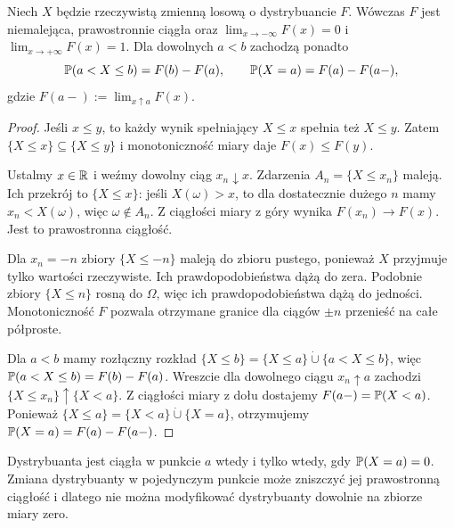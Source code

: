 \begin{twierdzenie}
Niech $X$ będzie rzeczywistą zmienną losową o dystrybuancie $F$.
Wówczas $F$ jest niemalejąca, prawostronnie ciągła oraz
$\lim_{x\to-\infty}F(x)=0$ i $\lim_{x\to+\infty}F(x)=1$.
Dla dowolnych $a<b$ zachodzą ponadto
\[
\mathbb{P}(a<X\leq b)=F(b)-F(a),\qquad
\mathbb{P}(X=a)=F(a)-F(a-),
\]
gdzie $F(a-):=\lim_{x\uparrow a}F(x)$.
\end{twierdzenie}
\begin{proof}
Jeśli $x\leq y$, to każdy wynik spełniający $X\leq x$
spełnia też $X\leq y$. Zatem
$\{X\leq x\}\subseteq\{X\leq y\}$ i monotoniczność
miary daje $F(x)\leq F(y)$.

Ustalmy $x\in\mathbb{R}$ i weźmy dowolny ciąg $x_n\downarrow x$.
Zdarzenia $A_n=\{X\leq x_n\}$ maleją. Ich przekrój
to $\{X\leq x\}$: jeśli $X(\omega)>x$, to dla
dostatecznie dużego $n$ mamy $x_n<X(\omega)$,
więc $\omega\notin A_n$. Z ciągłości miary z góry
wynika $F(x_n)\to F(x)$. Jest to prawostronna ciągłość.

Dla $x_n=-n$ zbiory $\{X\leq-n\}$ maleją
do zbioru pustego, ponieważ $X$ przyjmuje tylko
wartości rzeczywiste. Ich prawdopodobieństwa dążą do zera.
Podobnie zbiory $\{X\leq n\}$ rosną do $\Omega$,
więc ich prawdopodobieństwa dążą do jedności.
Monotoniczność $F$ pozwala otrzymane granice dla
ciągów $\pm n$ przenieść na całe półproste.

Dla $a<b$ mamy rozłączny rozkład
$\{X\leq b\}=\{X\leq a\}\mathbin{\dot\cup}
\{a<X\leq b\}$, więc
$\mathbb{P}(a<X\leq b)=F(b)-F(a)$.
Wreszcie dla dowolnego ciągu $x_n\uparrow a$
zachodzi $\{X\leq x_n\}\uparrow\{X<a\}$.
Z ciągłości miary z dołu dostajemy
$F(a-)=\mathbb{P}(X<a)$. Ponieważ
$\{X\leq a\}=\{X<a\}\mathbin{\dot\cup}\{X=a\}$,
otrzymujemy $\mathbb{P}(X=a)=F(a)-F(a-)$.
\end{proof}

\begin{wniosek}
Dystrybuanta jest ciągła w punkcie $a$ wtedy i tylko wtedy,
gdy $\mathbb{P}(X=a)=0$. Zmiana dystrybuanty w pojedynczym punkcie
może zniszczyć jej prawostronną ciągłość i dlatego nie można
modyfikować dystrybuanty dowolnie na zbiorze miary zero.
\end{wniosek}

